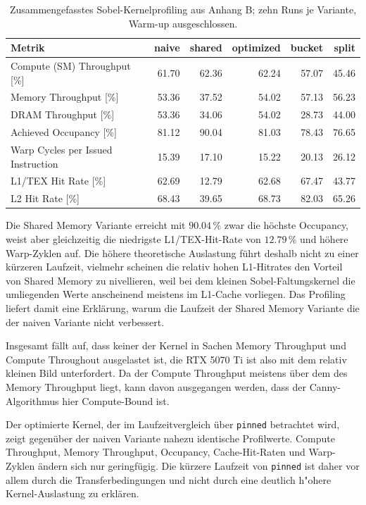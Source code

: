 \begin{table}[H]
    \centering
    \setlength{\tabcolsep}{3pt}
    \begin{tabularx}{\textwidth}{l R R R R R}
        \toprule
        Metrik & naive & shared & optimized & bucket & split \\
        \midrule
        Compute (SM) Throughput [\%] & 61.70 & 62.36 & 62.24 & 57.07 & 45.46 \\
        Memory Throughput [\%] & 53.36 & 37.52 & 54.02 & 57.13 & 56.23 \\
        DRAM Throughput [\%] & 53.36 & 34.06 & 54.02 & 28.73 & 44.00 \\
        Achieved Occupancy [\%] & 81.12 & 90.04 & 81.03 & 78.43 & 76.65 \\
        Warp Cycles per Issued Instruction & 15.39 & 17.10 & 15.22 & 20.13 & 26.12 \\
        L1/TEX Hit Rate [\%] & 62.69 & 12.79 & 62.68 & 67.47 & 43.77 \\
        L2 Hit Rate [\%] & 68.43 & 39.65 & 68.73 & 82.03 & 65.26 \\
        \bottomrule
    \end{tabularx}
    \caption{Zusammengefasstes Sobel-Kernelprofiling aus Anhang B;
        zehn Runs je Variante, Warm-up ausgeschlossen.}
    \label{tab:sobel-ncu}
\end{table}

Die Shared Memory Variante erreicht mit $90.04\,\%$ zwar die höchste
Occupancy, weist aber gleichzeitig die niedrigste L1/TEX-Hit-Rate von
$12.79\,\%$ und höhere Warp-Zyklen auf. Die
höhere theoretische Auslastung führt deshalb nicht zu einer kürzeren
Laufzeit, vielmehr scheinen die relativ hohen L1-Hitrates den Vorteil von Shared Memory zu nivellieren, weil bei dem kleinen Sobel-Faltungskernel die umliegenden Werte anscheinend meistens im L1-Cache vorliegen. Das Profiling liefert damit eine Erklärung, warum die Laufzeit der Shared Memory Variante die der naiven Variante nicht verbessert.

Insgesamt fällt auf, dass keiner der Kernel in Sachen Memory Throughput und Compute Throughout ausgelastet ist, die RTX 5070 Ti ist also mit dem relativ kleinen Bild unterfordert. Da der Compute Throughput meistens über dem des Memory Throughput liegt, kann davon ausgegangen werden, dass der Canny-Algorithmus hier Compute-Bound ist. 

Der optimierte Kernel, der im Laufzeitvergleich über \texttt{pinned}
betrachtet wird, zeigt gegenüber der naiven Variante nahezu identische
Profilwerte. Compute Throughput, Memory Throughput, Occupancy,
Cache-Hit-Raten und Warp-Zyklen ändern sich nur geringfügig. Die kürzere
Laufzeit von \texttt{pinned} ist
daher vor allem durch die Transferbedingungen und nicht durch eine deutlich
h{"o}here Kernel-Auslastung zu erklären.

